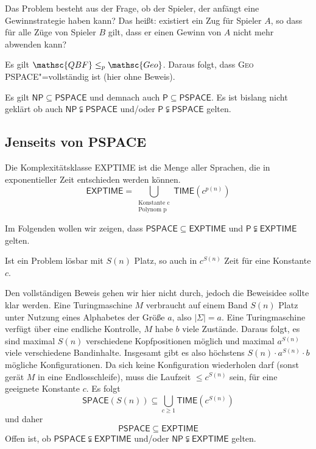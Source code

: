 Das Problem besteht aus der Frage, ob der Spieler, der anfängt eine Gewinnstrategie haben kann? Das heißt: existiert ein Zug für Spieler $A$, so dass für alle Züge von Spieler $B$ gilt, dass er einen Gewinn von $A$ nicht mehr abwenden kann?

Es gilt $\mathsc{QBF} \le_p \mathsc{Geo}$. Daraus folgt, dass \textsc{Geo} \textsf{PSPACE}"=vollständig ist (hier ohne Beweis).

Es gilt $\mathsf{NP} \subseteq \mathsf{PSPACE}$ und demnach auch $\mathsf{P} \subseteq \mathsf{PSPACE}$. Es ist bislang nicht geklärt ob auch $\mathsf{NP} \subsetneqq \mathsf{PSPACE}$ und/oder $\mathsf{P} \subsetneqq \mathsf{PSPACE}$ gelten.

\subsection{Jenseits von PSPACE}
\begin{Def}
  \hspace{\parindent}Die Komplexitätsklasse \textsf{EXPTIME} ist die Menge aller Sprachen, die in exponentieller Zeit entschieden werden können.
  \[ \mathsf{EXPTIME} = \bigcup_{\substack{\text{Konstante c} \\ \text{Polynom p}}} \mathsf{TIME}(c^{p(n)}) \]
\end{Def}

Im Folgenden wollen wir zeigen, dass $\mathsf{PSPACE} \subseteq \textsf{EXPTIME}$ und $\mathsf{P} \subsetneqq \textsf{EXPTIME}$ gelten.

\begin{Satz}
  \hspace{\parindent}Ist ein Problem lösbar mit $S(n)$ Platz, so auch in $c^{S(n)}$ Zeit für eine Konstante $c$.
\end{Satz}

\begin{Bew}
  \hspace{\parindent}Den vollständigen Beweis gehen wir hier nicht durch, jedoch die Beweisidee sollte klar werden. Eine Turingmaschine $M$ verbraucht auf einem Band $S(n)$ Platz unter Nutzung eines Alphabetes der Größe $a$, also $|\Sigma|=a$. Eine Turingmaschine verfügt über eine endliche Kontrolle, $M$ habe $b$ viele Zustände. Daraus folgt, es sind maximal $S(n)$ verschiedene Kopfpositionen möglich und maximal $a^{S(n)}$ viele verschiedene Bandinhalte. Insgesamt gibt es also höchstens $S(n) \cdot a^{S(n)} \cdot b$ mögliche Konfigurationen. Da sich keine Konfiguration wiederholen darf (sonst gerät $M$ in eine Endlosschleife), muss die Laufzeit $\le c^{S(n)}$ sein, für eine geeignete Konstante $c$. Es folgt
  \[ \mathsf{SPACE}(S(n)) \subseteq \bigcup_{c \ge 1} \mathsf{TIME}(c^{S(n)}) \]
  und daher 
  \[ \mathsf{PSPACE} \subseteq \mathsf{EXPTIME} \]
  Offen ist, ob $\mathsf{PSPACE} \subsetneqq \mathsf{EXPTIME}$ und/oder $\mathsf{NP} \subsetneqq \mathsf{EXPTIME}$ gelten.
\end{Bew}

